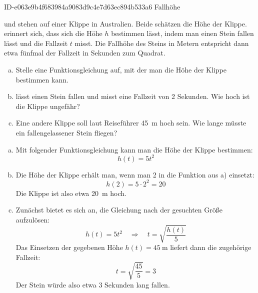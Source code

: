 \begin{exercise}
      {ID-e063e9b4f683984a9083d9c4e7d63ec894b533a6}
      {Fallhöhe}
  \ifproblem\problem\par
    \xya{} und \xyb{} stehen auf einer Klippe in Australien. Beide schätzen
    die Höhe der Klippe. \xya{} erinnert sich, dass sich die Höhe $h$ bestimmen
    lässt, indem man einen Stein fallen lässt und die Fallzeit $t$ misst. Die
    Fallhöhe des Steins in Metern entspricht dann etwa fünfmal der Fallzeit in
    Sekunden zum Quadrat.
    \begin{enumerate}[a)]
      \item Stelle eine Funktionsgleichung auf, mit der man die Höhe der Klippe
            bestimmen kann.
      \item \xya{} lässt einen Stein fallen und \xyb{} misst eine Fallzeit
            von \num{2} Sekunden. Wie hoch ist die Klippe ungefähr?
      \item Eine andere Klippe soll laut Reiseführer \SI{45}{\metre} hoch sein.
            Wie lange müsste ein fallengelassener Stein fliegen?
    \end{enumerate}
  \fi
  \ifoutcome\outcome
    \begin{enumerate}[a)]
      \item Mit folgender Funktionsgleichung kann man die Höhe der Klippe
            bestimmen:
            \begin{equation*}
              h(t)=5t^2
            \end{equation*}
      \item Die Höhe der Klippe erhält man, wenn man \num{2} in die Funktion aus a)
            einsetzt:
            \begin{equation*}
              h(\num{2})=5\cdot\num{2}^2=\num{20}
            \end{equation*}
            Die Klippe ist also etwa \SI{20}{\metre} hoch.
      \item Zunächst bietet es sich an, die
            Gleichung nach der gesuchten Größe
            aufzulösen:
            \begin{equation*}
              h(t)=5t^2\quad\Rightarrow\quad t=\sqrt{\frac{h(t)}{5}}
            \end{equation*}
            Das Einsetzen der gegebenen Höhe $h(t)=\SI{45}{\metre}$
            liefert dann die zugehörige Fallzeit:
            \begin{equation*}
              t=\sqrt{\frac{\num{45}}{5}}=\num{3}
            \end{equation*}
            Der Stein würde also etwa \num{3} Sekunden lang fallen.
    \end{enumerate}
  \fi
\end{exercise}
